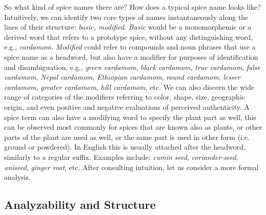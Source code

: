 So what kind of spice names there are? How does a typical spice name looks like? Intuitively, we can identify two core types of names instantaneously along the lines of their structure: \textit{basic, modified}. \textit{Basic} would be a monomorphemic or a derived word that refers to a prototype spice, without any distinguishing word, e.g., \textit{cardamom}. \textit{Modified} could refer to compounds and noun phrases that use a spice name as a headword, but also have a modifier for purposes of identification and disambiguation, e.g., \textit{green cardamom}, \textit{black cardamom}, \textit{true cardamom}, \textit{false cardamom}, \textit{Nepal cardamom}, \textit{Ethiopian cardamom}, \textit{round cardamom}, \textit{lesser cardamom}, \textit{greater cardamom}, \textit{hill cardamom}, etc. We can also discern the wide range of categories of the modifiers referring to color, shape, size, geographic origin, and even positive and negative evaluations of perceived authenticity. A spice term can also have a modifying word to specify the plant part as well, this can be observed most commonly for spices that are known also as plants, or other parts of the plant are used as well, or the same part is used in other form (i.e. ground or powdered). In English this is usually attached after the headword, similarly to a regular suffix. Examples include: \textit{cumin seed}, \textit{coriander-seed}, \textit{aniseed}, \textit{ginger root}, etc. After consulting intuition, let us consider a more formal analysis.



\subsection{Analyzability and Structure}

